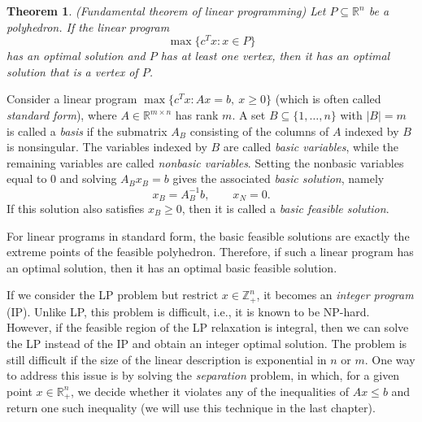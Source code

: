 \documentclass[12pt]{report}
\newtheorem{ttheorem}[base]{Theorem}
\numberwithin{algorithm}{chapter}
\begin{document}
	\begin{ttheorem} (Fundamental theorem of linear programming)
		Let $P \subseteq \mathbb{R}^{n}$ be a polyhedron. If the linear program \[ \max\{c^Tx : x\in P\} \] has an optimal solution and $P$ has at least one vertex, then it has an optimal solution that is a vertex of $P$. 
	\end{ttheorem}
	
	Consider a linear program $ \max \{c^Tx : Ax = b,\ x \geq 0\}$ (which is often called \emph{standard form}), where $A \in \mathbb{R}^{m \times n}$ has rank $m$. A set $B \subseteq \{1, \ldots, n\}$ with $|B| = m$ is called a \emph{basis} if the submatrix $A_B$ consisting of the columns of $A$ indexed by $B$ is nonsingular. The variables indexed by $B$ are called \emph{basic variables}, while the remaining variables are called \emph{nonbasic variables}. Setting the nonbasic variables equal to $0$ and solving $A_Bx_B = b$ gives the associated \emph{basic solution}, namely
	\[
	x_B = A_B^{-1}b, \qquad x_N = 0.
	\]
	If this solution also satisfies $x_B \geq 0$, then it is called a \emph{basic feasible solution}.
	
	For linear programs in standard form, the basic feasible solutions are exactly the extreme points of the feasible polyhedron. Therefore, if such a linear program has an optimal solution, then it has an optimal basic feasible solution.
	
	If we consider the LP problem but restrict $x \in \mathbb{Z}^{n}_{+}$, it becomes an \emph{integer program} (IP). Unlike LP, this problem is difficult, i.e., it is known to be NP-hard. However, if the feasible region of the LP relaxation is integral, then we can solve the LP instead of the IP and obtain an integer optimal solution. The problem is still difficult if the size of the linear description is exponential in $n$ or $m$. One way to address this issue is by solving the \emph{separation} problem, in which, for a given point $x \in \mathbb{R}^{n}_{+}$, we decide whether it violates any of the inequalities of $Ax \leq b$ and return one such inequality (we will use this technique in the last chapter).
	
\end{document}

